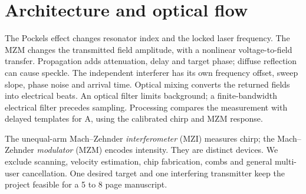 \documentclass[10pt,letterpaper]{article}
\begin{document}
\section{Architecture and optical flow}
\begin{center}
\end{center}
The Pockels effect changes resonator index and the locked laser frequency. The MZM changes the transmitted field amplitude, with a nonlinear voltage-to-field transfer. Propagation adds attenuation, delay and target phase; diffuse reflection can cause speckle. The independent interferer has its own frequency offset, sweep slope, phase noise and arrival time. Optical mixing converts the returned fields into electrical beats. An optical filter limits background; a finite-bandwidth electrical filter precedes sampling. Processing compares the measurement with delayed templates for A, using the calibrated chirp and MZM response.

The unequal-arm Mach--Zehnder \emph{interferometer} (MZI) measures chirp; the Mach--Zehnder \emph{modulator} (MZM) encodes intensity. They are distinct devices. We exclude scanning, velocity estimation, chip fabrication, combs and general multi-user cancellation. One desired target and one interfering transmitter keep the project feasible for a 5 to 8 page manuscript.
\newpage
\end{document}

